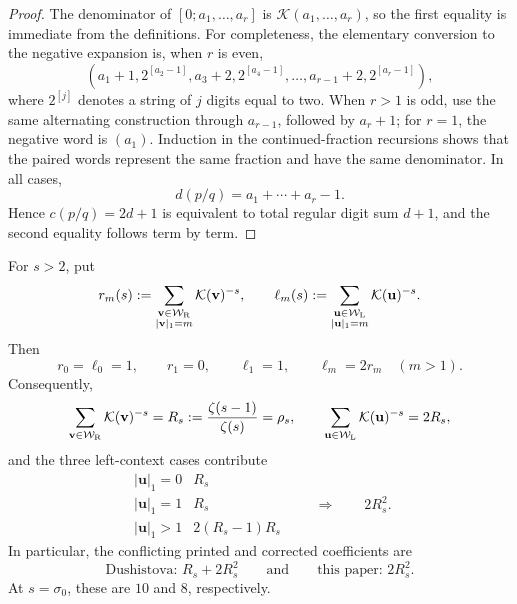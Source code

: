 \begin{proof}
The denominator of \([0;a_1,\ldots,a_r]\) is
\(\mathcal K(a_1,\ldots,a_r)\), so the first equality is immediate from
the definitions.  For completeness, the elementary conversion to the
negative expansion is, when \(r\) is even,
\[
 (a_1+1,2^{[a_2-1]},a_3+2,2^{[a_4-1]},\ldots,
   a_{r-1}+2,2^{[a_r-1]}),
\]
where \(2^{[j]}\) denotes a string of \(j\) digits equal to two.  When
\(r>1\) is odd, use the same alternating construction through \(a_{r-1}\),
followed by \(a_r+1\); for \(r=1\), the negative word is \((a_1)\).
Induction in the continued-fraction recursions shows that the paired words
represent the same fraction and have the same denominator.  In all cases,
\[
 d(p/q)=a_1+\cdots+a_r-1.
\]
Hence \(c(p/q)=2d+1\) is equivalent to total regular digit sum \(d+1\),
and the second equality follows term by term.
\end{proof}

\begin{lemma}
\label{lem:dushistova-endpoint-correction}
For \(s>2\), put
\[
 r_m(s):=\sum_{\substack{\mathbf v\in\mathcal W_{\rm R}\\
                          |\mathbf v|_1=m}}
          \mathcal K(\mathbf v)^{-s},
 \qquad
 \ell_m(s):=\sum_{\substack{\mathbf u\in\mathcal W_{\rm L}\\
                             |\mathbf u|_1=m}}
          \mathcal K(\mathbf u)^{-s}.
\]
Then
\[
 r_0=\ell_0=1,\qquad r_1=0,\qquad \ell_1=1,
 \qquad \ell_m=2r_m\quad(m>1).
\]
Consequently,
\begin{equation}
 \sum_{\mathbf v\in\mathcal W_{\rm R}}\mathcal K(\mathbf v)^{-s}
 =R_s:=\frac{\zeta(s-1)}{\zeta(s)}=\rho_s,
 \qquad
 \sum_{\mathbf u\in\mathcal W_{\rm L}}\mathcal K(\mathbf u)^{-s}
 =2R_s,
 \label{eq:brocot-context-masses}
\end{equation}
and the three left-context cases contribute
\begin{equation}
 \begin{array}{c|c}
  |\mathbf u|_1=0 & R_s\\
  |\mathbf u|_1=1 & R_s\\
  |\mathbf u|_1>1 & 2(R_s-1)R_s
 \end{array}
 \qquad\Longrightarrow\qquad 2R_s^2.
 \label{eq:left-context-endpoint-cases}
\end{equation}
In particular, the conflicting printed and corrected coefficients are
\begin{equation}
 \boxed{\text{Dushistova: }R_s+2R_s^2}
 \qquad\text{and}\qquad
 \boxed{\text{this paper: }2R_s^2}.
 \label{eq:dushistova-conflicting-constants}
\end{equation}
At \(s=\sigma_0\), these are \(10\) and \(8\), respectively.
\end{lemma}

